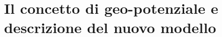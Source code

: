 \chapter[Il concetto di geo-potenziale e il nuovo modello]{Il concetto di geo-potenziale e descrizione del nuovo modello}